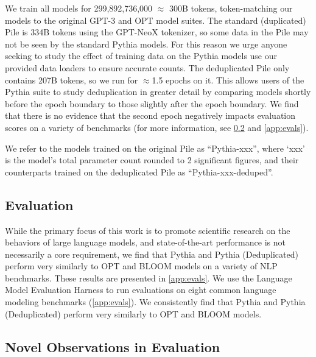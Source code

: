 We train all models for 299,892,736,000 $\approx$ 300B tokens, token-matching our models to the original GPT-3 and OPT model suites. The standard (duplicated) Pile is 334B tokens using the GPT-NeoX tokenizer, so some data in the Pile may not be seen by the standard Pythia models. For this reason we urge anyone seeking to study the effect of training data on the Pythia models use our provided data loaders to ensure accurate counts. The deduplicated Pile only contains 207B tokens, so we run for $\approx$1.5 epochs on it. This allows users of the Pythia suite to study deduplication in greater detail by comparing models shortly before the epoch boundary to those slightly after the epoch boundary. We find that there is no evidence that the second epoch negatively impacts evaluation scores on a variety of benchmarks (for more information, see \ref{sec:novel} and \ref{app:evals}).

We refer to the models trained on the original Pile as ``Pythia-xxx'', where `xxx' is the model's total parameter count rounded to 2 significant figures, and their counterparts trained on the deduplicated Pile as ``Pythia-xxx-deduped''.

\subsection{Evaluation}

While the primary focus of this work is to promote scientific research on the behaviors of large language models, and state-of-the-art performance is not necessarily a core requirement, we find that Pythia and Pythia (Deduplicated) perform very similarly to OPT and BLOOM models on a variety of NLP benchmarks. These results are presented in \ref{app:evals}. We use the Language Model Evaluation Harness \citep{gao2021eval} to run evaluations on eight common language modeling benchmarks (\ref{app:evals}). 
We consistently find that Pythia and Pythia (Deduplicated) perform very similarly to OPT and BLOOM models.

\subsection{Novel Observations in Evaluation}\label{sec:novel}

